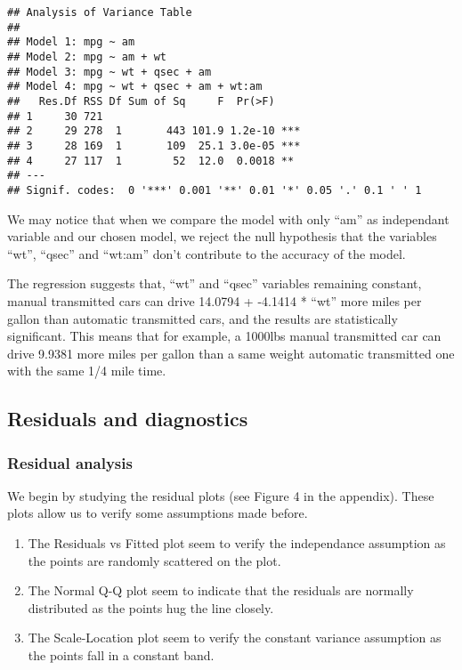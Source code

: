 \documentclass[a3paper]{article}
\begin{document}
\begin{verbatim}
## Analysis of Variance Table
## 
## Model 1: mpg ~ am
## Model 2: mpg ~ am + wt
## Model 3: mpg ~ wt + qsec + am
## Model 4: mpg ~ wt + qsec + am + wt:am
##   Res.Df RSS Df Sum of Sq     F  Pr(>F)    
## 1     30 721                               
## 2     29 278  1       443 101.9 1.2e-10 ***
## 3     28 169  1       109  25.1 3.0e-05 ***
## 4     27 117  1        52  12.0  0.0018 ** 
## ---
## Signif. codes:  0 '***' 0.001 '**' 0.01 '*' 0.05 '.' 0.1 ' ' 1
\end{verbatim}

We may notice that when we compare the model with only ``am'' as
independant variable and our chosen model, we reject the null hypothesis
that the variables ``wt'', ``qsec'' and ``wt:am'' don't contribute to
the accuracy of the model.

The regression suggests that, ``wt'' and ``qsec'' variables remaining
constant, manual transmitted cars can drive 14.0794 + -4.1414 * ``wt''
more miles per gallon than automatic transmitted cars, and the results
are statistically significant. This means that for example, a 1000lbs
manual transmitted car can drive 9.9381 more miles per gallon than a
same weight automatic transmitted one with the same 1/4 mile time.

\subsection{Residuals and diagnostics}\label{residuals-and-diagnostics}

\subsubsection{Residual analysis}\label{residual-analysis}

We begin by studying the residual plots (see Figure 4 in the appendix).
These plots allow us to verify some assumptions made before.

\begin{enumerate}
\def\labelenumi{\arabic{enumi}.}
\setcounter{enumi}{2}
\itemsep1pt\parskip0pt
\item
  The Residuals vs Fitted plot seem to verify the independance
  assumption as the points are randomly scattered on the plot.
\item
  The Normal Q-Q plot seem to indicate that the residuals are normally
  distributed as the points hug the line closely.
\item
  The Scale-Location plot seem to verify the constant variance
  assumption as the points fall in a constant band.
\end{enumerate}
\end{document}
